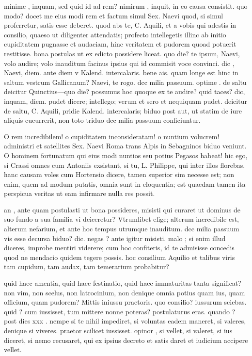  minime , inquam, sed quid id ad rem? nimirum , inquit, in eo causa consistit. quo modo? docet me eius modi rem et factum simul Sex. Naevi quod, si simul proferretur, satis esse deberet. quod abs te, C. Aquili, et a vobis qui adestis in consilio, quaeso ut diligenter attendatis; profecto intellegetis illinc ab initio cupiditatem pugnasse et audaciam, hinc veritatem et pudorem quoad potuerit restitisse. bona postulas ut ex edicto possidere liceat. quo die? te ipsum, Naevi, volo audire; volo inauditum facinus ipsius qui id commisit voce convinci. dic , Naevi, diem. ante diem v Kalend. intercalaris. bene ais. quam longe est hinc in saltum vestrum Gallicanum? Naevi, te rogo. dcc milia passuum. optime . de saltu deicitur Quinctius—quo die? possumus hoc quoque ex te audire? quid taces? dic, inquam, diem. pudet dicere; intellego; verum et sero et nequiquam pudet. deicitur de saltu, C. Aquili, pridie Kalend. intercalaris; biduo post aut, ut statim de iure aliquis cucurrerit, non toto triduo dcc milia passuum conficiuntur.

 O rem incredibilem! o cupiditatem inconsideratam! o nuntium volucrem! administri et satellites Sex. Naevi Roma trans Alpis in Sebagninos biduo veniunt. O hominem fortunatum qui eius modi nuntios seu potius Pegasos habeat! hic ego, si Crassi omnes cum Antoniis exsistant, si tu, L. Philippe, qui inter illos florebas, hanc causam voles cum Hortensio dicere, tamen superior sim necesse est; non enim, quem ad modum putatis, omnia sunt in eloquentia; est quaedam tamen ita perspicua veritas ut eam infirmare nulla res possit.

 an , ante quam postulasti ut bona possideres, misisti qui curaret ut dominus de suo fundo a sua familia vi deiceretur? Vtrumlibet elige; alterum incredibile est, alterum nefarium, et ante hoc tempus utrumque inauditum. dcc milia passuum vis esse decursa biduo? dic. negas ? ante igitur misisti. malo ; si enim illud diceres, improbe mentiri viderere; cum hoc confiteris, id te admisisse concedis quod ne mendacio quidem tegere possis. hoc consilium Aquilio et talibus viris tam cupidum, tam audax, tam temerarium probabitur?

 quid haec amentia, quid haec festinatio, quid haec immaturitas tanta significat? non vim, non scelus, non latrocinium, non denique omnia potius quam ius, quam officium, quam pudorem? Mittis iniussu praetoris. quo consilio? iussurum sciebas. quid ? cum iussisset, tum mittere nonne poteras? postulaturus eras. quando ? post dies xxx . nempe si te nihil impediret, si voluntas eadem maneret, si valeres, denique si viveres. praetor scilicet iussisset. opinor , si vellet, si valeret, si ius diceret, si nemo recusaret, qui ex ipsius decreto et satis daret et iudicium accipere vellet.

